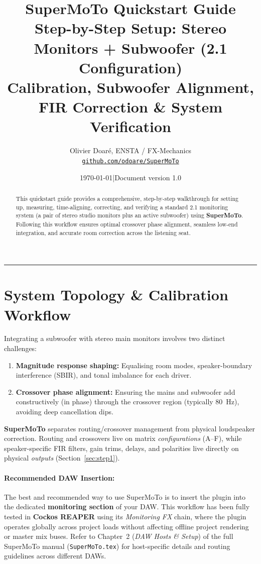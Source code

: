 \documentclass[11pt,a4paper]{article}
\title{{\Huge\textbf{SuperMoTo Quickstart Guide}}\\[0.4em]
       \Large Step-by-Step Setup: Stereo Monitors + Subwoofer (2.1 Configuration)\\[0.8em]
       \large Calibration, Subwoofer Alignment, FIR Correction \& System Verification}
\author{Olivier Doaré, ENSTA / FX-Mechanics\\
\href{https://github.com/odoare/SuperMoTo}{\texttt{github.com/odoare/SuperMoTo}}}
\date{\today \quad|\quad Document version 1.0}
\begin{document}
\maketitle

\begin{abstract}
\noindent This quickstart guide provides a comprehensive, step-by-step walkthrough for setting up, measuring, time-aligning, correcting, and verifying a standard 2.1 monitoring system (a pair of stereo studio monitors plus an active subwoofer) using \textbf{SuperMoTo}. Following this workflow ensures optimal crossover phase alignment, seamless low-end integration, and accurate room correction across the listening seat.
\end{abstract}

\tableofcontents
\vspace{0.8cm}
\hrule
\vspace{0.8cm}

\section{System Topology \& Calibration Workflow}

Integrating a subwoofer with stereo main monitors involves two distinct challenges:
\begin{enumerate}[nosep]
  \item \textbf{Magnitude response shaping:} Equalising room modes, speaker-boundary interference (SBIR), and tonal imbalance for each driver.
  \item \textbf{Crossover phase alignment:} Ensuring the mains and subwoofer add constructively (in phase) through the crossover region (typically \SI{80}{\hertz}), avoiding deep cancellation dips.
\end{enumerate}

\noindent \textbf{SuperMoTo} separates routing/crossover management from physical loudspeaker correction. Routing and crossovers live on matrix \emph{configurations} (A--F), while speaker-specific FIR filters, gain trims, delays, and polarities live directly on physical \emph{outputs} (Section~\ref{sec:step1}).

\paragraph{Recommended DAW Insertion:}
The best and recommended way to use SuperMoTo is to insert the plugin into the dedicated \textbf{monitoring section} of your DAW. This workflow has been fully tested in \textbf{Cockos REAPER} using its \textit{Monitoring FX} chain, where the plugin operates globally across project loads without affecting offline project rendering or master mix buses. Refer to Chapter~2 (\textit{DAW Hosts \& Setup}) of the full SuperMoTo manual (\texttt{SuperMoTo.tex}) for host-specific details and routing guidelines across different DAWs.
\end{document}
